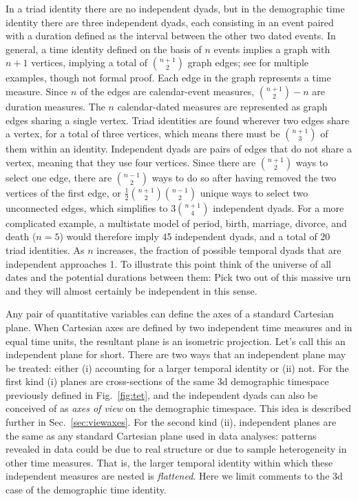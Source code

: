 \documentclass{bmcart}
\begin{document}
In a triad identity there are no independent dyads, but in the demographic time identity there are three independent dyads, each consisting in an event paired with a duration defined as the interval between the other two dated events. In general, a time identity defined on the basis of $n$ events implies a graph with $n+1$ vertices, implying a total of $\binom{n+1}{2}$ graph edges; see \citet{riffe2017demographictime} for multiple examples, though not formal proof. Each edge in the graph represents a time measure. Since $n$ of the edges are calendar-event measures, $\binom{n+1}{2} - n$ are duration measures. The $n$ calendar-dated measures are represented as graph edges sharing a single vertex. Triad identities are found wherever two edges share a vertex, for a total of three vertices, which means there must be $\binom{n+1}{3}$ of them within an identity. Independent dyads are pairs of edges that do not share a vertex, meaning that they use four vertices. Since there are $\binom{n+1}{2}$ ways to select one edge, there are $\binom{n-1}{2}$ ways to do so after having removed the two vertices of the first edge, or $\frac{1}{2}\binom{n+1}{2}\binom{n-1}{2}$ unique ways to select two unconnected edges, which simplifies to $3\binom{n+1}{4}$ independent dyads. For a more complicated example, a multistate model of period, birth, marriage, divorce, and death ($n=5$) would therefore imply 45 independent dyads, and a total of 20 triad identities. As $n$ increases, the fraction of possible temporal dyads that are independent approaches 1. To illustrate this point think of the universe of all dates and the potential durations between them: Pick two out of this massive urn and they will almost certainly be independent in this sense.

Any pair of quantitative variables can define the axes of a standard Cartesian plane. When Cartesian axes are defined by two independent time measures and in equal time units, the resultant plane is an isometric projection. Let's call this an independent plane for short. There are two ways that an independent plane may be treated: either (i) accounting for a larger temporal identity or (ii) not. For the first kind (i) planes are cross-sections of the same 3d demographic timespace previously defined in Fig.~\ref{fig:tet}, and the independent dyads can also be conceived of as \emph{axes of view} on the demographic timespace. This idea is described further in Sec.~\ref{sec:viewaxes}. For the second kind (ii), independent planes are the same as any standard Cartesian plane used in data analyses: patterns revealed in data could be due to real structure or due to sample heterogeneity in other time measures. That is, the larger temporal identity within which these independent measures are nested is \emph{flattened}. Here we limit comments to the 3d case of the demographic time identity.
\end{document}
